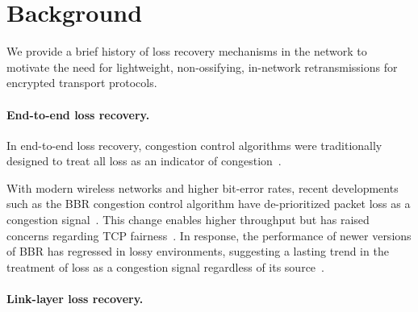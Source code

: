 \section{Background}
\label{sec:background}

We provide a brief history of loss recovery mechanisms in the network to
motivate the need for lightweight, non-ossifying, in-network retransmissions
for encrypted transport protocols.

\paragraph{End-to-end loss recovery.}

In end-to-end loss recovery,
congestion control algorithms were traditionally designed to treat all loss as an indicator of
congestion~\cite{rfc5681tcp,rfc2001tcp}.

With modern wireless networks and higher bit-error rates, recent developments
such as the BBR congestion control
algorithm have de-prioritized packet loss as a congestion
signal~\cite{cardwell2017bbr}. This change enables higher throughput but has
raised concerns regarding TCP fairness~\cite
{ware2019modeling,philip2024prudentia}. In response, the performance of newer
versions of BBR has regressed in lossy environments, suggesting a lasting trend
in the treatment of loss as a congestion signal regardless of its source~\cite
{atc-submission}.


\paragraph{Link-layer loss recovery.}

